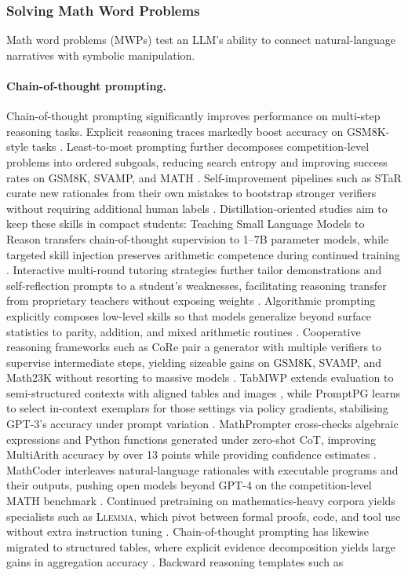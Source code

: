 \documentclass[acmsmall,anonymous]{acmart}
\begin{document}
\subsubsection{Solving Math Word Problems}\label{sec:mwp}
Math word problems (MWPs) test an LLM’s ability to connect natural-language narratives with symbolic manipulation.  

\paragraph{Chain-of-thought prompting.}
Chain-of-thought prompting significantly improves performance on multi-step reasoning tasks.
Explicit reasoning traces markedly boost accuracy on GSM8K-style tasks \cite{wei2022chain}.  Least-to-most prompting further decomposes competition-level problems into ordered subgoals, reducing search entropy and improving success rates on GSM8K, SVAMP, and MATH \cite{zhou-2023-least}.  Self-improvement pipelines such as STaR curate new rationales from their own mistakes to bootstrap stronger verifiers without requiring additional human labels \cite{zelikman-2022-star}.  Distillation-oriented studies aim to keep these skills in compact students: Teaching Small Language Models to Reason transfers chain-of-thought supervision to 1–7B parameter models, while targeted skill injection preserves arithmetic competence during continued training \cite{magister-2023-teaching,sharma-2022-skill-injection}.  Interactive multi-round tutoring strategies further tailor demonstrations and self-reflection prompts to a student's weaknesses, facilitating reasoning transfer from proprietary teachers without exposing weights \cite{wang-2023-tailored-learning}.  Algorithmic prompting explicitly composes low-level skills so that models generalize beyond surface statistics to parity, addition, and mixed arithmetic routines \cite{zhou-2022-teaching-algorithmic}.  Cooperative reasoning frameworks such as CoRe pair a generator with multiple verifiers to supervise intermediate steps, yielding sizeable gains on GSM8K, SVAMP, and Math23K without resorting to massive models \cite{zhu-2023-core}.  TabMWP extends evaluation to semi-structured contexts with aligned tables and images \cite{lu-2022-tabmwp}, while PromptPG learns to select in-context exemplars for those settings via policy gradients, stabilising GPT-3's accuracy under prompt variation \cite{lu-2023-dynamic-prompt}.  MathPrompter cross-checks algebraic expressions and Python functions generated under zero-shot CoT, improving MultiArith accuracy by over 13 points while providing confidence estimates \cite{imani-2023-mathprompter}.  MathCoder interleaves natural-language rationales with executable programs and their outputs, pushing open models beyond GPT-4 on the competition-level MATH benchmark \cite{wang-2023-mathcoder}.  Continued pretraining on mathematics-heavy corpora yields specialists such as \textsc{Llemma}, which pivot between formal proofs, code, and tool use without extra instruction tuning \cite{azerbayev-2024-llemma}.  Chain-of-thought prompting has likewise migrated to structured tables, where explicit evidence decomposition yields large gains in aggregation accuracy \cite{zheng-2023-tabular-cot}.  Backward reasoning templates such as 
\end{document}
